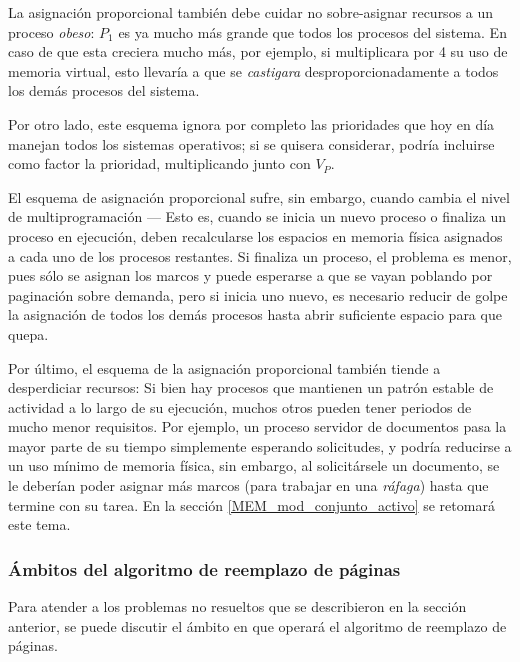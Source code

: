 \documentclass[11pt,fleqn]{book} %
\begin{document}
La asignación proporcional también debe cuidar no sobre-asignar
recursos a un proceso \emph{obeso}: $P_1$ es ya mucho más grande que todos
los procesos del sistema. En caso de que esta creciera mucho más, por
ejemplo, si multiplicara por 4 su uso de memoria virtual, esto
llevaría a que se \emph{castigara} desproporcionadamente a todos los demás
procesos del sistema.

Por otro lado, este esquema ignora por completo las prioridades que
hoy en día manejan todos los sistemas operativos; si se quisera considerar, 
podría incluirse como factor la prioridad, multiplicando junto con $V_P$.

El esquema de asignación proporcional sufre, sin embargo, cuando
cambia el nivel de multiprogramación — Esto es, cuando se inicia un
nuevo proceso o finaliza un proceso en ejecución, deben recalcularse
los espacios en memoria física asignados a cada uno de los procesos
restantes. Si finaliza un proceso, el problema es menor, pues sólo se
asignan los marcos y puede esperarse a que se vayan poblando por
paginación sobre demanda, pero si inicia uno nuevo, es necesario
reducir de golpe la asignación de todos los demás procesos hasta
abrir suficiente espacio para que quepa.

Por último, el esquema de la asignación proporcional también tiende a
desperdiciar recursos: Si bien hay procesos que mantienen un patrón
estable de actividad a lo largo de su ejecución, muchos otros pueden
tener periodos de mucho menor requisitos. Por ejemplo, un proceso
servidor de documentos pasa la mayor parte de su tiempo simplemente
esperando solicitudes, y podría reducirse a un uso mínimo de memoria
física, sin embargo, al solicitársele un documento, se le deberían
poder asignar más marcos (para trabajar en una \emph{ráfaga}) hasta que
termine con su tarea. En la sección \ref{MEM_mod_conjunto_activo} se
retomará este tema.
\subsubsection{Ámbitos del algoritmo de reemplazo de páginas}
\label{sec-5-5-4-3}


Para atender a los problemas no resueltos que se describieron en 
la sección anterior, se puede discutir el ámbito en que operará el algoritmo de
reemplazo de páginas.
\end{document}
